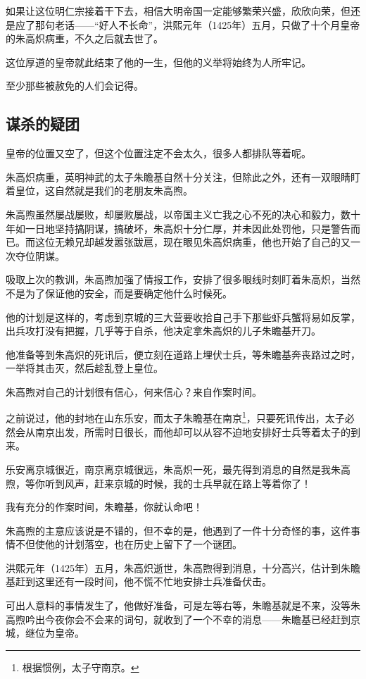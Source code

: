 \begin{multicols}{\theparacolNo}
如果让这位明仁宗接着干下去，相信大明帝国一定能够繁荣兴盛，欣欣向荣，但还是应了那句老话——“好人不长命”，洪熙元年（1425年）五月，只做了十个月皇帝的朱高炽病重，不久之后就去世了。

这位厚道的皇帝就此结束了他的一生，但他的义举将始终为人所牢记。

至少那些被赦免的人们会记得。

\subsection{谋杀的疑团}
皇帝的位置又空了，但这个位置注定不会太久，很多人都排队等着呢。

朱高炽病重，英明神武的太子朱瞻基自然十分关注，但除此之外，还有一双眼睛盯着皇位，这自然就是我们的老朋友朱高煦。

朱高煦虽然屡战屡败，却屡败屡战，以帝国主义亡我之心不死的决心和毅力，数十年如一日地坚持搞阴谋，搞破坏，朱高炽十分仁厚，并未因此处罚他，只是警告而已。而这位无赖兄却越发嚣张跋扈，现在眼见朱高炽病重，他也开始了自己的又一次夺位阴谋。

吸取上次的教训，朱高煦加强了情报工作，安排了很多眼线时刻盯着朱高炽，当然不是为了保证他的安全，而是要确定他什么时候死。

他的计划是这样的，考虑到京城的三大营要收拾自己手下那些虾兵蟹将易如反掌，出兵攻打没有把握，几乎等于自杀，他决定拿朱高炽的儿子朱瞻基开刀。

他准备等到朱高炽的死讯后，便立刻在道路上埋伏士兵，等朱瞻基奔丧路过之时，一举将其击灭，然后趁乱登上皇位。

朱高煦对自己的计划很有信心，何来信心？来自作案时间。

之前说过，他的封地在山东乐安，而太子朱瞻基在南京\footnote{根据惯例，太子守南京。}，只要死讯传出，太子必然会从南京出发，所需时日很长，而他却可以从容不迫地安排好士兵等着太子的到来。

乐安离京城很近，南京离京城很远，朱高炽一死，最先得到消息的自然是我朱高煦，等你听到风声，赶来京城的时候，我的士兵早就在路上等着你了！

我有充分的作案时间，朱瞻基，你就认命吧！

朱高煦的主意应该说是不错的，但不幸的是，他遇到了一件十分奇怪的事，这件事情不但使他的计划落空，也在历史上留下了一个谜团。

洪熙元年（1425年）五月，朱高炽逝世，朱高煦得到消息，十分高兴，估计到朱瞻基赶到这里还有一段时间，他不慌不忙地安排士兵准备伏击。

可出人意料的事情发生了，他做好准备，可是左等右等，朱瞻基就是不来，没等朱高煦吟出今夜你会不会来的词句，就收到了一个不幸的消息——朱瞻基已经赶到京城，继位为皇帝。


\end{multicols}
